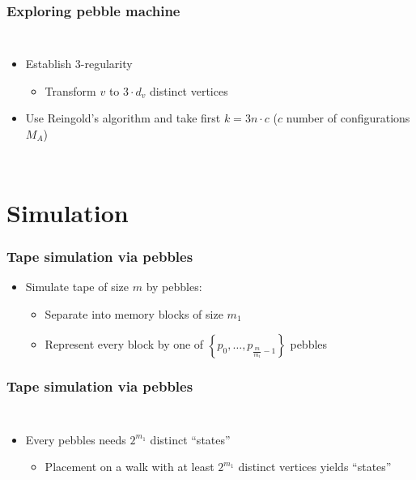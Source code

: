 \documentclass{beamer}
\begin{document}
\begin{frame}
  \frametitle{Exploring pebble machine}
  \begin{columns}
    \begin{itemize}
      \item<2-> Establish 3-regularity
        \begin{itemize}
          \item Transform $v$ to $3\cdot d_{v}$ distinct vertices
        \end{itemize}
      \item<4-> Use Reingold's algorithm and take first $k = 3n\cdot c$ ($c$ number of
        configurations $M_{A}$)
    \end{itemize}
  \end{columns}
\end{frame}

\section{Simulation}
\begin{frame}
  \frametitle{Tape simulation via pebbles}
  \begin{itemize}
    \item Simulate tape of size $m$ by pebbles:
      \begin{itemize}
        \item<3-> Separate into memory blocks of size $m_{1}$
        \item<4-> Represent every block by one of $\left\{p_{0},\dots,p_{\frac{m}{m_{1}}-1}\right\}$ pebbles
      \end{itemize}
  \end{itemize}
\end{frame}

\begin{frame}
  \frametitle{Tape simulation via pebbles}
  
  \begin{columns}
    \begin{itemize}
      \item Every pebbles needs $2^{m_{1}}$ distinct \enquote{states}
        \begin{itemize}
          \item Placement on a walk with at least $2^{m_{1}}$ distinct vertices
            yields \enquote{states}
        \end{itemize}
    \end{itemize}
    \resizebox{\textwidth}{!}{}
  \end{columns}
\end{frame}
\end{document}
